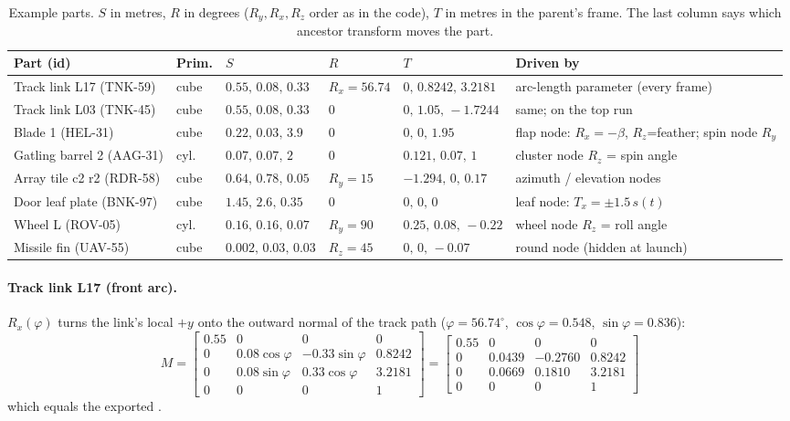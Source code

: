 \begin{table}[h]
\centering\footnotesize
\setlength{\tabcolsep}{3pt}
\caption{Example parts. $S$ in metres, $R$ in degrees ($R_y,R_x,R_z$ order as in the code), $T$ in metres in the
parent's frame. The last column says which ancestor transform moves the part.}
\label{tab:mexamples}
\begin{tabular}{@{}p{2.5cm}l p{2.5cm} p{1.7cm} p{3.2cm} p{3.2cm}@{}}
\toprule
Part (id) & Prim. & $S$ & $R$ & $T$ & Driven by\\\midrule
Track link L17 (TNK-59) & cube & $0.55,\,0.08,\,0.33$ & $R_x=56.74$ & $0,\,0.8242,\,3.2181$ & arc-length parameter (every frame)\\
Track link L03 (TNK-45) & cube & $0.55,\,0.08,\,0.33$ & $0$ & $0,\,1.05,\,-1.7244$ & same; on the top run\\
Blade 1 (HEL-31) & cube & $0.22,\,0.03,\,3.9$ & $0$ & $0,\,0,\,1.95$ & flap node: $R_x=-\beta$, $R_z$=feather; spin node $R_y$\\
Gatling barrel 2 (AAG-31) & cyl. & $0.07,\,0.07,\,2$ & $0$ & $0.121,\,0.07,\,1$ & cluster node $R_z$ = spin angle\\
Array tile c2 r2 (RDR-58) & cube & $0.64,\,0.78,\,0.05$ & $R_y=15$ & $-1.294,\,0,\,0.17$ & azimuth / elevation nodes\\
Door leaf plate (BNK-97) & cube & $1.45,\,2.6,\,0.35$ & $0$ & $0,\,0,\,0$ & leaf node: $T_x=\pm1.5\,s(t)$\\
Wheel L (ROV-05) & cyl. & $0.16,\,0.16,\,0.07$ & $R_y=90$ & $0.25,\,0.08,\,-0.22$ & wheel node $R_z$ = roll angle\\
Missile fin (UAV-55) & cube & $0.002,\,0.03,\,0.03$ & $R_z=45$ & $0,\,0,\,-0.07$ & round node (hidden at launch)\\\bottomrule
\end{tabular}
\end{table}

\paragraph{Track link L17 (front arc).} $R_x(\varphi)$ turns the link's local $+y$ onto the outward
normal of the track path ($\varphi=56.74^\circ$, $\cos\varphi=0.548$, $\sin\varphi=0.836$):
\begin{equation}
M=\begin{bmatrix}0.55&0&0&0\\0&0.08\cos\varphi&-0.33\sin\varphi&0.8242\\0&0.08\sin\varphi&0.33\cos\varphi&3.2181\\0&0&0&1\end{bmatrix}
=\begin{bmatrix}0.55&0&0&0\\0&0.0439&-0.2760&0.8242\\0&0.0669&0.1810&3.2181\\0&0&0&1\end{bmatrix}
\end{equation}
which equals the exported .

